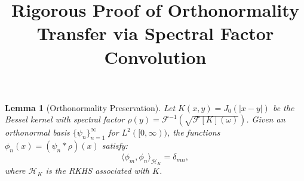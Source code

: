 \documentclass{article}
\newtheorem{lemma}{Lemma}
\begin{document}
\title{Rigorous Proof of Orthonormality Transfer via Spectral Factor Convolution}
\author{}
\date{}
\maketitle

\begin{lemma}[Orthonormality Preservation]
Let $K(x,y) = J_0(|x-y|)$ be the Bessel kernel with spectral factor $\rho(y) = \mathcal{F}^{-1}\left(\sqrt{\mathcal{F}[K](\omega)}\right)$. Given an orthonormal basis $\{\psi_n\}_{n=1}^\infty$ for $L^2([0,\infty))$, the functions $\phi_n(x) = (\psi_n * \rho)(x)$ satisfy:
\[
\langle \phi_m, \phi_n \rangle_{\mathscr{H}_K} = \delta_{mn},
\]
where $\mathscr{H}_K$ is the RKHS associated with $K$.
\end{lemma}
\end{document}
